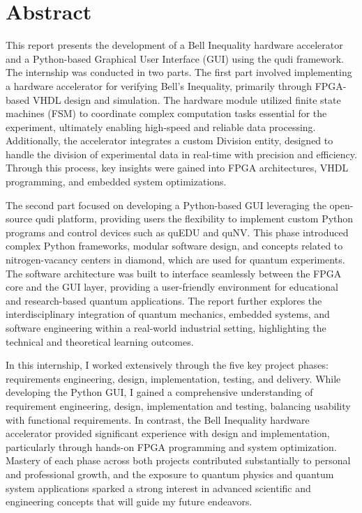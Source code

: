 \thispagestyle{empty} 
\chapter*{Abstract}

This report presents the development of a Bell Inequality hardware accelerator and a Python-based Graphical User Interface (GUI) using the qudi framework. The internship was conducted in two parts. The first part involved implementing a hardware accelerator for verifying Bell’s Inequality, primarily through \acs{FPGA}-based VHDL design and simulation. The hardware module utilized finite state machines (FSM) to coordinate complex computation tasks essential for the experiment, ultimately enabling high-speed and reliable data processing. Additionally, the accelerator integrates a custom Division entity, designed to handle the division of experimental data in real-time with precision and efficiency. Through this process, key insights were gained into \acs{FPGA} architectures, VHDL programming, and embedded system optimizations.

The second part focused on developing a Python-based \acs{GUI} leveraging the open-source qudi platform, providing users the flexibility to implement custom Python programs and control devices such as \acs{quEDU} and \acs{quNV}. This phase introduced complex Python frameworks, modular software design, and concepts related to nitrogen-vacancy centers in diamond, which are used for quantum experiments. The software architecture was built to interface seamlessly between the \acs{FPGA} core and the \acs{GUI} layer, providing a user-friendly environment for educational and research-based quantum applications. The report further explores the interdisciplinary integration of quantum mechanics, embedded systems, and software engineering within a real-world industrial setting, highlighting the technical and theoretical learning outcomes.

In this internship, I worked extensively through the five key project phases: requirements engineering, design, implementation, testing, and delivery. While developing the Python \acs{GUI}, I gained a comprehensive understanding of requirement engineering, design, implementation and testing, balancing usability with functional requirements. In contrast, the Bell Inequality hardware accelerator provided significant experience with design and implementation, particularly through hands-on \acs{FPGA} programming and system optimization. Mastery of each phase across both projects contributed substantially to personal and professional growth, and the exposure to quantum physics and quantum system applications sparked a strong interest in advanced scientific and engineering concepts that will guide my future endeavors.

